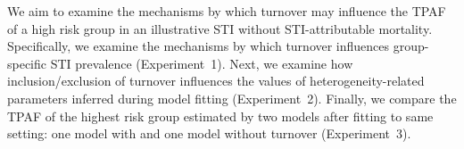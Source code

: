 

\par
We aim to examine the mechanisms by which turnover     %
may influence the TPAF of a high risk group			%
in an illustrative STI without STI-attributable mortality.
Specifically, we examine the mechanisms by which turnover
influences group-specific STI prevalence
(Experiment~1).
Next, we examine how inclusion/exclusion of turnover influences
the values of heterogeneity-related parameters inferred during model fitting
(Experiment~2).
Finally, we compare the TPAF of the highest risk group
estimated by two models after fitting to same setting:
one model with and one model without turnover
(Experiment~3).
